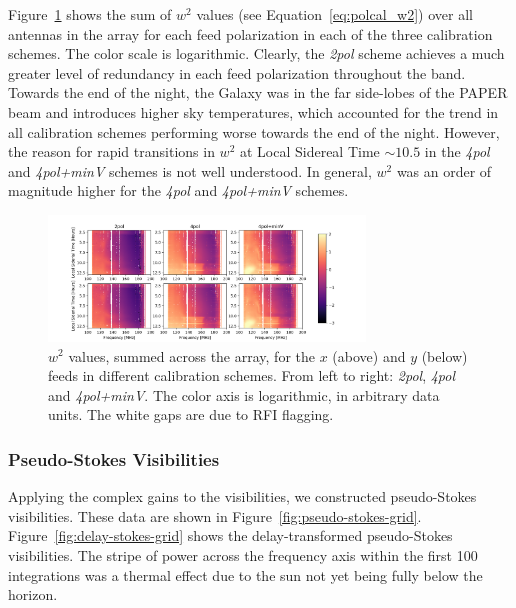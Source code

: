 Figure~\ref{fig:polcal_chisq} shows the sum of $w^2$ values (see Equation~\ref{eq:polcal_w2}) over all antennas in the array for each feed polarization in each of the three calibration schemes. The color scale is logarithmic. Clearly, the \textit{2pol} scheme achieves a much greater level of redundancy in each feed polarization throughout the band. Towards the end of the night, the Galaxy was in the far side-lobes of the PAPER beam and introduces higher sky temperatures, which accounted for the trend in all calibration schemes performing worse towards the end of the night. However, the reason for rapid transitions in $w^2$ at Local Sidereal Time $\sim 10.5$ in the \textit{4pol} and \textit{4pol+minV} schemes is not well understood. In general, $w^2$ was an order of magnitude higher for the \textit{4pol} and \textit{4pol+minV} schemes.

\begin{figure}
\centering
\includegraphics[width=0.75\textwidth]{chapters/polcal/figures/chisq.png}
\caption[$w^2$ values, summed across the array.]{$w^2$ values, summed across the array, for the $x$ (above) and $y$ (below) feeds in different calibration schemes. From left to right: \textit{2pol}, \textit{4pol} and \textit{4pol+minV}. The color axis is logarithmic, in arbitrary data units. The white gaps are due to RFI flagging.}
\label{fig:polcal_chisq}
\end{figure}

\subsubsection{Pseudo-Stokes Visibilities}

Applying the complex gains to the visibilities, we constructed pseudo-Stokes visibilities. These data are shown in Figure~\ref{fig:pseudo-stokes-grid}. Figure~\ref{fig:delay-stokes-grid} shows the delay-transformed pseudo-Stokes visibilities. The stripe of power across the frequency axis within the first 100 integrations was a thermal effect due to the sun not yet being fully below the horizon.

